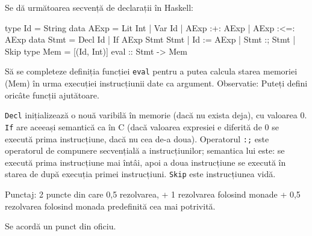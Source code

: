 \documentclass[addpoints,12pt,a4paper]{exam}
\begin{document}
\begin{questions}

Se dă următoarea secvență de declarații în Haskell:

\begin{asciihs}
type Id = String
data AExp = Lit Int | Var Id | AExp :+: AExp | AExp :<=: AExp
data Stmt = Decl Id | If AExp Stmt Stmt | Id := AExp | Stmt :; Stmt | Skip
type Mem = [(Id, Int)]
eval :: Stmt -> Mem
\end{asciihs}

Să se completeze definiția funcției \lstinline$eval$ pentru a putea calcula starea memoriei (Mem) în urma execuției instrucțiunii date ca argument.  Observatie: Puteți defini oricâte funcții ajutătoare.

\lstinline$Decl$ inițializează o nouă varibilă în memorie (dacă nu exista deja), cu valoarea 0.
\lstinline$If$ are aceeași semantică ca în C (dacă valoarea expresiei e diferită de 0 se execută prima instrucțiune, dacă nu cea de-a doua). Operatorul \lstinline$:;$ este operatorul de compunere secvențială a instrucțiunilor; semantica lui este: se execută prima instrucțiune mai întâi, apoi a doua instrucțiune se execută în starea de după execuția primei instrucțiuni. \lstinline$Skip$ este instrucțiunea vidă. 

Punctaj: 2 puncte din care 0,5 rezolvarea, + 1 rezolvarea folosind monade + 0,5 rezolvarea folosind monada predefinită cea mai potrivită.
\end{questions}

Se acordă un punct din oficiu.
\end{document}
